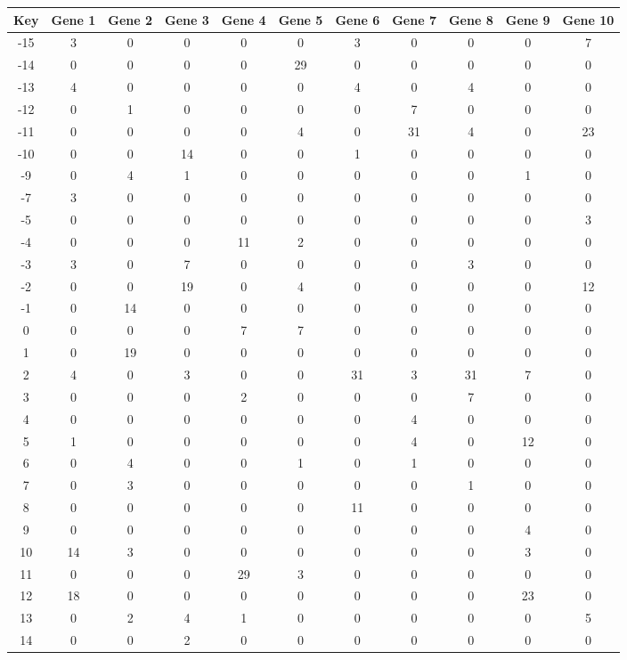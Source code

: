 \begin{tabular}{|c|c|c|c|c|c|c|c|c|c|c|}
\hline
Key & Gene 1 & Gene 2 & Gene 3 & Gene 4 & Gene 5 & Gene 6 & Gene 7 & Gene 8 & Gene 9 & Gene 10 \\
\hline
-15 & 3 & 0 & 0 & 0 & 0 & 3 & 0 & 0 & 0 & 7 \\
-14 & 0 & 0 & 0 & 0 & 29 & 0 & 0 & 0 & 0 & 0 \\
-13 & 4 & 0 & 0 & 0 & 0 & 4 & 0 & 4 & 0 & 0 \\
-12 & 0 & 1 & 0 & 0 & 0 & 0 & 7 & 0 & 0 & 0 \\
-11 & 0 & 0 & 0 & 0 & 4 & 0 & 31 & 4 & 0 & 23 \\
-10 & 0 & 0 & 14 & 0 & 0 & 1 & 0 & 0 & 0 & 0 \\
-9 & 0 & 4 & 1 & 0 & 0 & 0 & 0 & 0 & 1 & 0 \\
-7 & 3 & 0 & 0 & 0 & 0 & 0 & 0 & 0 & 0 & 0 \\
-5 & 0 & 0 & 0 & 0 & 0 & 0 & 0 & 0 & 0 & 3 \\
-4 & 0 & 0 & 0 & 11 & 2 & 0 & 0 & 0 & 0 & 0 \\
-3 & 3 & 0 & 7 & 0 & 0 & 0 & 0 & 3 & 0 & 0 \\
-2 & 0 & 0 & 19 & 0 & 4 & 0 & 0 & 0 & 0 & 12 \\
-1 & 0 & 14 & 0 & 0 & 0 & 0 & 0 & 0 & 0 & 0 \\
0 & 0 & 0 & 0 & 7 & 7 & 0 & 0 & 0 & 0 & 0 \\
1 & 0 & 19 & 0 & 0 & 0 & 0 & 0 & 0 & 0 & 0 \\
2 & 4 & 0 & 3 & 0 & 0 & 31 & 3 & 31 & 7 & 0 \\
3 & 0 & 0 & 0 & 2 & 0 & 0 & 0 & 7 & 0 & 0 \\
4 & 0 & 0 & 0 & 0 & 0 & 0 & 4 & 0 & 0 & 0 \\
5 & 1 & 0 & 0 & 0 & 0 & 0 & 4 & 0 & 12 & 0 \\
6 & 0 & 4 & 0 & 0 & 1 & 0 & 1 & 0 & 0 & 0 \\
7 & 0 & 3 & 0 & 0 & 0 & 0 & 0 & 1 & 0 & 0 \\
8 & 0 & 0 & 0 & 0 & 0 & 11 & 0 & 0 & 0 & 0 \\
9 & 0 & 0 & 0 & 0 & 0 & 0 & 0 & 0 & 4 & 0 \\
10 & 14 & 3 & 0 & 0 & 0 & 0 & 0 & 0 & 3 & 0 \\
11 & 0 & 0 & 0 & 29 & 3 & 0 & 0 & 0 & 0 & 0 \\
12 & 18 & 0 & 0 & 0 & 0 & 0 & 0 & 0 & 23 & 0 \\
13 & 0 & 2 & 4 & 1 & 0 & 0 & 0 & 0 & 0 & 5 \\
14 & 0 & 0 & 2 & 0 & 0 & 0 & 0 & 0 & 0 & 0 \\
\hline
\end{tabular}